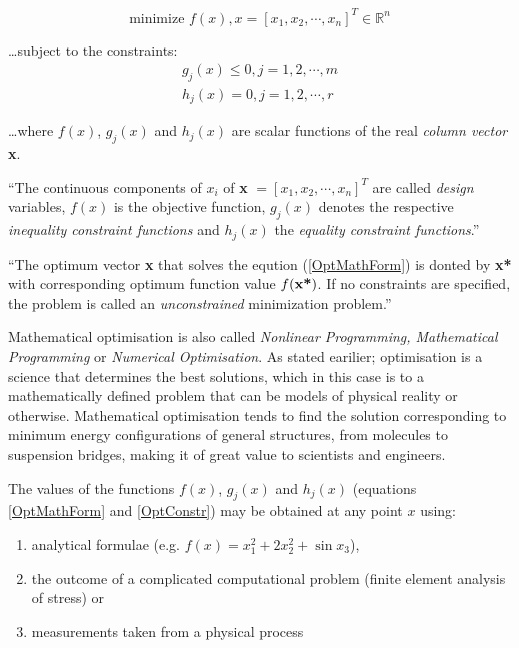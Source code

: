 \begin{equation}
\text{minimize }f(x),x=[x_1,x_2,\cdots,x_n]^T \in \mathbb{R}^n
\label{OptMathForm}
\end{equation}

\ldots subject to the constraints:
\begin{equation}
\begin{split}
g_j(x)\leq 0, j=1,2,\cdots,m \\
h_j(x)=0, j=1,2,\cdots,r
\label{OptConstr}
\end{split}
\end{equation}

\ldots where $f(x)$, $g_j(x)$ and $h_j(x)$ are scalar functions of the real \emph{column vector} \textbf{x}. \cite{snyman05}

``The continuous components of $x_i$ of \textbf{x} $=[x_1,x_2,\cdots,x_n]^T$ are called \emph{design} variables, $f(x)$ is the objective function, $g_j(x)$ denotes the respective \emph{inequality constraint functions} and $h_j(x)$ the \emph{equality constraint functions}.'' \cite{snyman05}

``The optimum vector \textbf{x} that solves the eqution (\ref{OptMathForm}) is donted by \textbf{x*} with corresponding optimum function value $f(\text{\textbf{x*}})$. If no constraints are specified, the problem is called an \emph{unconstrained} minimization problem.'' \cite{snyman05}

Mathematical optimisation is also called \emph{Nonlinear Programming, Mathematical Programming} or \emph{Numerical Optimisation}. As stated earilier; optimisation is a science that determines the best solutions, which in this case is to a mathematically defined problem that can be models of physical reality or otherwise. Mathematical optimisation tends to find the solution corresponding to minimum energy configurations of general structures, from molecules to suspension bridges, making it of great value to scientists and engineers.

The values of the functions $f(x)$, $g_j(x)$ and $h_j(x)$ (equations \ref{OptMathForm} and \ref{OptConstr}) may be obtained at any point $x$ using:
\vspace{-0.5cm}
\begin{enumerate}
\item analytical formulae (e.g. $f(x)=x_1 ^2+2x_2 ^2+\sin x_3$),
\item the outcome of a complicated computational problem (finite element analysis of stress) or
\item measurements taken from a physical process
\end{enumerate}
\vspace{-0.5cm}

